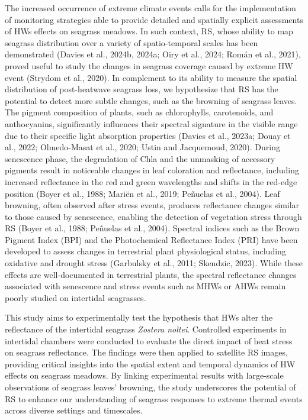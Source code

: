 \documentclass[
  letterpaper,
  11pt,
  english,
  singlespacing,
  headsepline]{MastersDoctoralThesis}
\begin{document}
\begin{spacing}{1.5}
The increased occurrence of extreme climate events calls for the
implementation of monitoring strategies able to provide detailed and
spatially explicit assessments of HWs effects on seagrass meadows. In
such context, RS, whose ability to map seagrass distribution over a
variety of spatio-temporal scales has been demonstrated (Davies et al.,
2024b, 2024a; Oiry et al., 2024; Román et al., 2021), proved useful to
study the changes in seagrass coverage caused by extreme HW event
(Strydom et al., 2020). In complement to its ability to measure the
spatial distribution of post-heatwave seagrass loss, we hypothesize that
RS has the potential to detect more subtle changes, such as the browning
of seagrass leaves. The pigment composition of plants, such as
chlorophylls, carotenoids, and anthocyanins, significantly influences
their spectral signature in the visible range due to their specific
light absorption properties (Davies et al., 2023a; Douay et al., 2022;
Olmedo-Masat et al., 2020; Ustin and Jacquemoud, 2020). During
senescence phase, the degradation of Chla and the unmasking of accessory
pigments result in noticeable changes in leaf coloration and
reflectance, including increased reflectance in the red and green
wavelengths and shifts in the red-edge position (Boyer et al., 1988;
Mariën et al., 2019; Peñuelas et al., 2004). Leaf browning, often
observed after stress events, produces reflectance changes similar to
those caused by senescence, enabling the detection of vegetation stress
through RS (Boyer et al., 1988; Peñuelas et al., 2004). Spectral indices
such as the Brown Pigment Index (BPI) and the Photochemical Reflectance
Index (PRI) have been developed to assess changes in terrestrial plant
physiological status, including oxidative and drought stress (Garbulsky
et al., 2011; Skendzic, 2023). While these effects are well-documented
in terrestrial plants, the spectral reflectance changes associated with
senescence and stress events such as MHWs or AHWs remain poorly studied
on intertidal seagrasses.

This study aims to experimentally test the hypothesis that HWs alter the
reflectance of the intertidal seagrass \emph{Zostera noltei}. Controlled
experiments in intertidal chambers were conducted to evaluate the direct
impact of heat stress on seagrass reflectance. The findings were then
applied to satellite RS images, providing critical insights into the
spatial extent and temporal dynamics of HW effects on seagrass meadows.
By linking experimental results with large-scale observations of
seagrass leaves' browning, the study underscores the potential of RS to
enhance our understanding of seagrass responses to extreme thermal
events across diverse settings and timescales.


\end{spacing}
\end{document}
